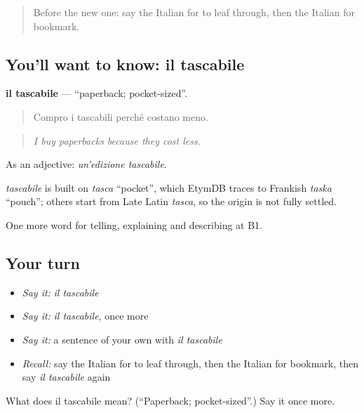 \label{lesson:IT-C525-tascabile}



\begin{quote}
Before the new one: say the Italian for to leaf through, then the Italian for bookmark.
\end{quote}

\subsection*{You'll want to know: il tascabile}
\textbf{il tascabile} — \textquotedblleft{}paperback; pocket-sized\textquotedblright{}.

\begin{quote}
Compro i tascabili perché costano meno.
\end{quote}

\begin{quote}
\emph{I buy paperbacks because they cost less.}
\end{quote}

As an adjective: \emph{un'edizione tascabile}.

\begin{cousinweb}
\emph{tascabile} is built on \emph{tasca} \textquotedblleft{}pocket\textquotedblright{}, which EtymDB traces to Frankish \emph{taska} \textquotedblleft{}pouch\textquotedblright{}; others start from Late Latin \emph{tasca}, so the origin is not fully settled.
\end{cousinweb}

\begin{grammarlens}[title={What you've built}]
One more word for telling, explaining and describing at B1.
\end{grammarlens}

\subsection*{Your turn}
\begin{itemize}
\raggedright
  \item \emph{Say it:} \emph{il tascabile}
  \item \emph{Say it:} \emph{il tascabile}, once more
  \item \emph{Say it:} a sentence of your own with \emph{il tascabile}
  \item \emph{Recall:} say the Italian for to leaf through, then the Italian for bookmark, then say \emph{il tascabile} again
\end{itemize}

\begin{tcolorbox}[breakable,colback=teal!4,colframe=teal!35!black,title={Before you move on}]
What does il tascabile mean? (\textquotedblleft{}Paperback; pocket-sized\textquotedblright{}.) Say it once more.
\end{tcolorbox}
